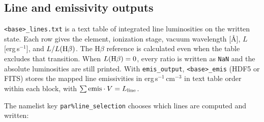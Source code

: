 \documentclass[english,a4paper]{my_memo}
\newcommand{\code}[1]{\texttt{#1}}
\begin{document}
\subsection{Line and emissivity outputs}
\label{sec:lineout}
\code{<base>\_lines.txt} is a text table of integrated line luminosities on
the written state. Each row gives the element, ionization stage, vacuum
wavelength [\AA], $L$ [erg\,s$^{-1}$], and $L/L({\rm H}\beta)$.
The H$\beta$ reference is calculated even when the table excludes that
transition. When $L({\rm H}\beta)=0$, every ratio is written as
\code{NaN} and the absolute luminosities are still printed.
With \code{emis\_output}, \code{<base>\_emis} (HDF5 or FITS)
stores the mapped line emissivities in erg\,s$^{-1}$\,cm$^{-3}$ in text
table order within each block, with $\sum {\rm emis}\cdot V = L_{\rm line}$.

The namelist key \code{par\%line\_selection} chooses which lines are
computed and written:
\end{document}
